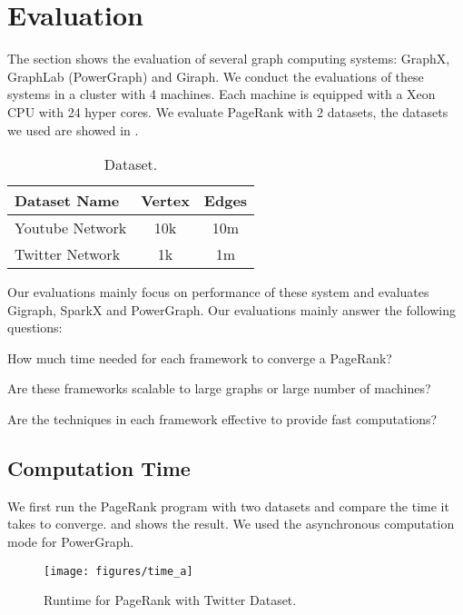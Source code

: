 \section{Evaluation} \label{eval}
The section shows the evaluation of several graph computing systems:
GraphX, GraphLab (PowerGraph) and Giraph.
We conduct the evaluations of these systems in a cluster with 4 machines.
Each machine is equipped with a Xeon CPU with 24 hyper cores.
We evaluate PageRank with 2 datasets, the datasets we used are showed in
.

\begin{table}[tbh]
  \center
  \begin{tabular}{l|c|c}
    \textbf{Dataset Name} & \textbf{Vertex} & \textbf{Edges} \\
      \hline
      Youtube Network & 10k & 10m \\
      \hline
      Twitter Network & 1k & 1m
  \end{tabular}
  \caption{Dataset.}
  \label{tab:dataset}
\end{table}

Our evaluations mainly focus on performance of these system and evaluates
Gigraph, SparkX and PowerGraph.
Our evaluations mainly answer the following questions:
\begin{tightenum}

\item[\S\ref{subsec:time}:] How much time needed for each framework
to converge a PageRank?

\item[\S\ref{subsec:scalability}:] Are these frameworks scalable to
large graphs or large number of machines?

\item[\S\ref{subsec:technique}:] Are the techniques in each framework
effective to provide fast computations?
\end{tightenum}

\subsection{Computation Time} \label{subsec:time}
We first run the PageRank program with two datasets and compare the
time it takes to converge.  and 
shows the result. We used the asynchronous computation mode
for PowerGraph.

\begin{figure}[t]
  \texttt{[image: figures/time\_a]}
  \caption{Runtime for PageRank with Twitter Dataset.}
  \label{fig:time:a}
\end{figure}


